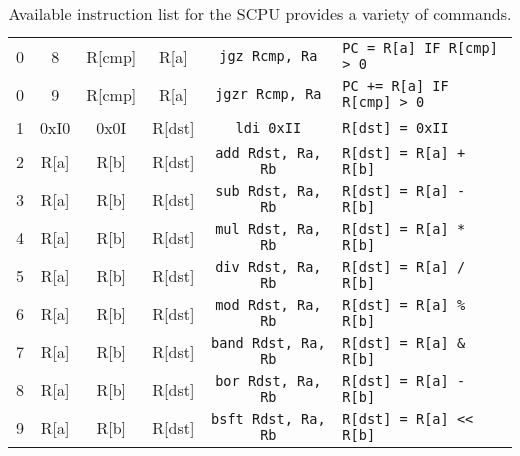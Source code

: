 \documentclass{article}
\begin{document}
\begin{table}[h!]
\begin{footnotesize}
\begin{tabular}{cccc|c|l}
			0 & 8 & R[cmp] & R[a] & \texttt{jgz Rcmp, Ra} & \texttt{PC = R[a] IF R[cmp] > 0} \\
			0 & 9 & R[cmp] & R[a] & \texttt{jgzr Rcmp, Ra} & \texttt{PC += R[a] IF R[cmp] > 0} \\
			1 & 0xI0 & 0x0I & R[dst] & \texttt{ldi 0xII} & \texttt{R[dst] = 0xII} \\
			2 & R[a] & R[b] & R[dst] & \texttt{add Rdst, Ra, Rb} & \texttt{R[dst] = R[a] + R[b]} \\
			3 & R[a] & R[b] & R[dst] & \texttt{sub Rdst, Ra, Rb} & \texttt{R[dst] = R[a] - R[b]} \\
			4 & R[a] & R[b] & R[dst] & \texttt{mul Rdst, Ra, Rb} & \texttt{R[dst] = R[a] * R[b]} \\
			5 & R[a] & R[b] & R[dst] & \texttt{div Rdst, Ra, Rb} & \texttt{R[dst] = R[a] / R[b]} \\
			6 & R[a] & R[b] & R[dst] & \texttt{mod Rdst, Ra, Rb} & \texttt{R[dst] = R[a] \% R[b]} \\
			7 & R[a] & R[b] & R[dst] & \texttt{band Rdst, Ra, Rb} & \texttt{R[dst] = R[a] \& R[b]} \\
			8 & R[a] & R[b] & R[dst] & \texttt{bor Rdst, Ra, Rb} & \texttt{R[dst] = R[a] - R[b]} \\
			9 & R[a] & R[b] & R[dst] & \texttt{bsft Rdst, Ra, Rb} & \texttt{R[dst] = R[a] << R[b]} \\
			\hline
		\end{tabular}
	\end{footnotesize}
	\label{table:instruction-table}
	\caption{Available instruction list for the SCPU provides a variety of commands.}
\end{table}
\end{document}
